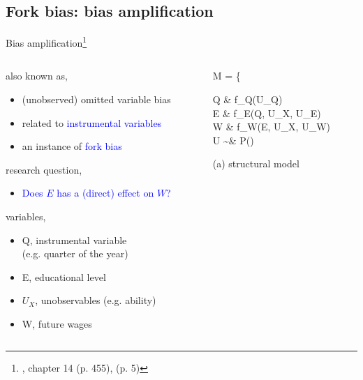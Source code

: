 \subsection{Fork bias: bias amplification}
%
%
\begin{frame}[t, negative]
	\subsectionpage
\end{frame}
%
%
\begin{frame}
	{Bias amplification\footnote{\citet{McElreath_2020}, chapter 14 (p. 455), \citet{Cinelli_et_al_2021} (p. 5)}}
	\begin{columns}
		\begin{column}{0.5\textwidth}
			also known as,
			\begin{itemize}
				\item (unobserved) omitted variable bias
				\item related to \textcolor{blue}{instrumental variables}
				\item an instance of \textcolor{blue}{fork bias}
			\end{itemize}
			
			research question, 
			\begin{itemize}
				\item \textcolor{blue}{Does $E$ has a (direct) effect on $W$?}
			\end{itemize}
			
			variables,
			\begin{itemize}
				\item Q, instrumental variable \\
				(e.g. quarter of the year)
				\item E, educational level
				\item $U_{X}$, unobservables (e.g. ability)
				\item W, future wages
			\end{itemize}
		\end{column}
		\begin{column}{0.5\textwidth}  
			\begin{equ}
				M = \left\{ \begin{aligned} 
					Q \leftarrow & \; f_{Q}(U_{Q}) \\
					E \leftarrow & \; f_{E}(Q, U_{X}, U_{E}) \\
					W \leftarrow & \; f_{W}(E, U_{X}, U_{W}) \\
					U \sim & \; P()
				\end{aligned} \right
				\caption*{(a) structural model}
			\end{equ}
			\begin{figure}
\end{figure}
\end{column}
\end{columns}
\end{frame}
